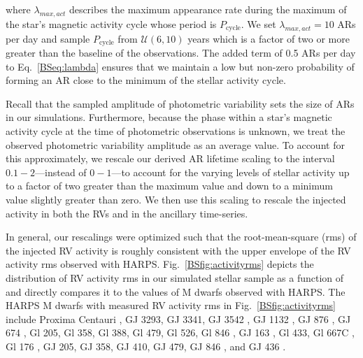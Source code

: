 \noindent where $\lambda_{max,act}$ describes the maximum appearance rate during the maximum of the star's
magnetic activity cycle whose period is $P_{\text{cycle}}$. We set $\lambda_{max,act}=10$ ARs per day and sample
$P_{\text{cycle}}$ from $\mathcal{U}(6,10)$ years \citep{mascareno16, wargelin17} which is a factor of two or more
greater than the baseline of the observations. The added term of 0.5 ARs per day
to Eq.~\ref{BSeq:lambda} ensures that we maintain a low but non-zero probability of forming an AR close to the
minimum of the stellar activity cycle.

Recall that the sampled amplitude of photometric variability sets the size of ARs in our simulations.
Furthermore, because the phase within a star's magnetic activity cycle at the time of photometric observations
is unknown, we treat the observed photometric variability amplitude as an average value. To account for this
approximately, we rescale our
derived AR lifetime scaling to the interval $0.1-2$---instead of $0-1$---to account for the varying levels of
stellar activity up to a factor of two greater than the maximum value and down to a minimum value slightly greater
than zero. We then use this scaling to rescale the injected activity in both the RVs and in the ancillary time-series.

In general, our rescalings were optimized such that the root-mean-square (rms) of the injected RV activity is
roughly consistent with the upper envelope of the RV activity rms observed with HARPS.
Fig.~\ref{BSfig:activityrms} depicts the distribution of RV activity rms in our simulated stellar
sample as a function of \prot{} and directly compares it to the values of M dwarfs observed with HARPS.
The HARPS M dwarfs with measured RV activity rms in Fig.~\ref{BSfig:activityrms} include
Proxima Centauri \citep{angladaescude16},
GJ 3293, GJ 3341, GJ 3542 \citep{astudillodefru15},
GJ 1132 \citep{berta15}, 
GJ 876 \citep{correia10},
GJ 674 \citep{bonfils07},
Gl 205, Gl 358, Gl 388, Gl 479, Gl 526, Gl 846 \citep{bonfils13},
GJ 163 \citep{bonfils13b},
Gl 433, Gl 667C \citep{delfosse13b},
Gl 176 \citep{forveille09},
GJ 205, GJ 358, GJ 410, GJ 479, GJ 846 \citep{hebrard16},
and GJ 436 \citep{lanotte14}. 

